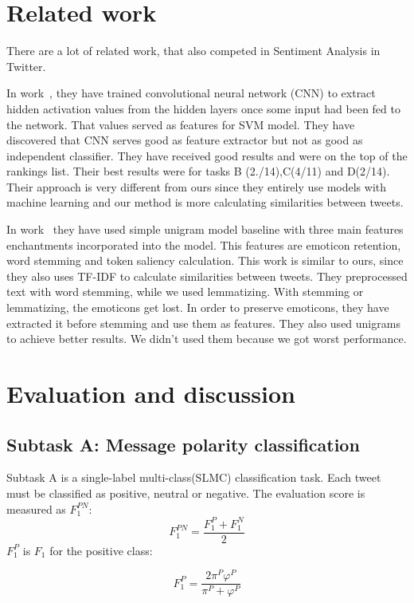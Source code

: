 \documentclass[runningheads,a4paper]{llncs}
\begin{document}
\section{Related work}
There are a lot of related work, that also competed in Sentiment Analysis in Twitter.

 In work~\cite{vilaresa2016lys}, they have trained convolutional neural network (CNN) to extract hidden activation values from the hidden layers once some input had been fed to the network. That values served as features for SVM model. They have discovered that CNN serves good as feature extractor but not as good as independent classifier. They have received good results and were on the top of the rankings list. Their best results were for tasks B (2./14),C(4/11) and D(2/14). Their approach is very different from ours since they entirely use models with machine learning and our method is more calculating similarities between tweets. 

In work~\cite{briones2016vcu} they have used simple unigram model baseline with three main features enchantments incorporated into the model. This features are emoticon retention, word stemming and token saliency calculation. This work is similar to ours, since they also uses TF-IDF to calculate similarities between tweets. They preprocessed text with word stemming, while we used lemmatizing. With stemming or lemmatizing, the emoticons get lost. In order to preserve emoticons, they have extracted it before stemming and use them as features. They also used unigrams to achieve better results. We didn't used them because we got worst performance.

\section{Evaluation and discussion}


\subsection{Subtask A: Message polarity classification}
Subtask A is a single-label multi-class(SLMC) classification task. Each tweet must be classified as positive, neutral or negative. The evaluation score is measured as $F^{PN}_1$:
\begin{equation}
F^{PN}_1 = \frac{F^P_1 + F^N_1}{2}
\end{equation}
$F_1^P$ is $F_1$ for the positive class:

\begin{equation}
F^{P}_1 = \frac{2\pi^P\varphi^P}{\pi^P + \varphi^P}
\end{equation}
\end{document}
